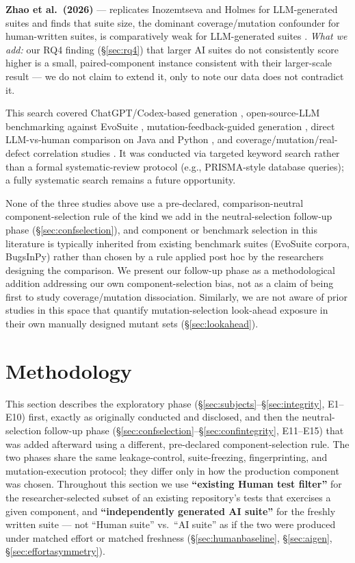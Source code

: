 \documentclass[10pt,conference]{IEEEtran}
\begin{document}
\textbf{Zhao et al.\ (2026)} — replicates Inozemtseva and Holmes for LLM-generated suites and finds that suite size, the dominant coverage/mutation confounder for human-written suites, is comparatively weak for LLM-generated suites \cite{zhao2026}. \emph{What we add:} our RQ4 finding (\S\ref{sec:rq4}) that larger AI suites do not consistently score higher is a small, paired-component instance consistent with their larger-scale result — we do not claim to extend it, only to note our data does not contradict it.

This search covered ChatGPT/Codex-based generation \cite{yuan2023}, open-source-LLM benchmarking against EvoSuite \cite{yang2024ase,ouedraogo2026}, mutation-feedback-guided generation \cite{mutap2024,mutgen2026}, direct LLM-vs-human comparison on Java \cite{lops2025agonetest} and Python \cite{vathana2026}, and coverage/mutation/real-defect correlation studies \cite{inozemtseva2014,papadakis2019survey,zhao2026}. It was conducted via targeted keyword search rather than a formal systematic-review protocol (e.g., PRISMA-style database queries); a fully systematic search remains a future opportunity.

None of the three studies above use a pre-declared, comparison-neutral component-selection rule of the kind we add in the neutral-selection follow-up phase (\S\ref{sec:confselection}), and component or benchmark selection in this literature is typically inherited from existing benchmark suites (EvoSuite corpora, BugsInPy) rather than chosen by a rule applied post hoc by the researchers designing the comparison. We present our follow-up phase as a methodological addition addressing our own component-selection bias, not as a claim of being first to study coverage/mutation dissociation. Similarly, we are not aware of prior studies in this space that quantify mutation-selection look-ahead exposure in their own manually designed mutant sets (\S\ref{sec:lookahead}).

\section{Methodology}
\label{sec:methodology}

This section describes the exploratory phase (\S\ref{sec:subjects}--\S\ref{sec:integrity}, E1--E10) first, exactly as originally conducted and disclosed, and then the neutral-selection follow-up phase (\S\ref{sec:confselection}--\S\ref{sec:confintegrity}, E11--E15) that was added afterward using a different, pre-declared component-selection rule. The two phases share the same leakage-control, suite-freezing, fingerprinting, and mutation-execution protocol; they differ only in how the production component was chosen. Throughout this section we use \textbf{``existing Human test filter''} for the researcher-selected subset of an existing repository's tests that exercises a given component, and \textbf{``independently generated AI suite''} for the freshly written suite — not ``Human suite'' vs.\ ``AI suite'' as if the two were produced under matched effort or matched freshness (\S\ref{sec:humanbaseline}, \S\ref{sec:aigen}, \S\ref{sec:effortasymmetry}).
\end{document}
